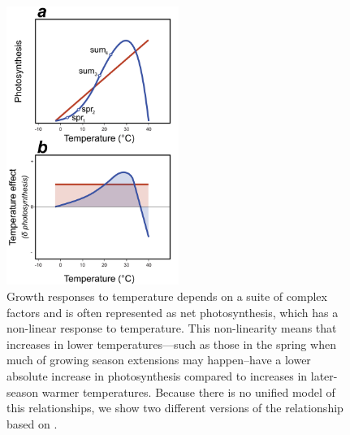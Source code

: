 \documentclass[11pt]{article}
\begin{document}
\clearpage
\begin{figure}[h!]
\includegraphics[width=0.5\textwidth]{..//figures/_allfiguresFromRuben/Tempresponses.png} %
\caption{Growth responses to temperature depends on a suite of complex factors and is often represented as net photosynthesis, which has a non-linear response to temperature. This non-linearity means that increases in lower temperatures---such as those in the spring when much of growing season extensions may happen--have a lower absolute increase in photosynthesis compared to increases in later-season warmer temperatures. Because there is no unified model of this relationships, we show two different versions of the relationship based on \citet{larcher2003,rezende2019thermal}.}
\label{fig:temperaturecomplex}
\end{figure}
\end{document}

